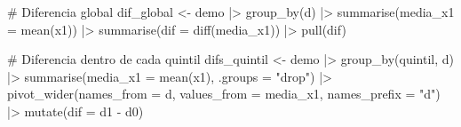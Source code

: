 \documentclass[
  letterpaper,
  DIV=11,
  numbers=noendperiod,
  oneside]{scrreprt}
\newenvironment{Shaded}{\begin{snugshade}}{\end{snugshade}}
\newcommand{\AttributeTok}[1]{\textcolor[rgb]{0.40,0.45,0.13}{#1}}
\newcommand{\CommentTok}[1]{\textcolor[rgb]{0.37,0.37,0.37}{#1}}
\newcommand{\FunctionTok}[1]{\textcolor[rgb]{0.28,0.35,0.67}{#1}}
\newcommand{\NormalTok}[1]{\textcolor[rgb]{0.00,0.23,0.31}{#1}}
\newcommand{\OtherTok}[1]{\textcolor[rgb]{0.00,0.23,0.31}{#1}}
\newcommand{\SpecialCharTok}[1]{\textcolor[rgb]{0.37,0.37,0.37}{#1}}
\newcommand{\StringTok}[1]{\textcolor[rgb]{0.13,0.47,0.30}{#1}}
\begin{document}
\begin{Shaded}
\begin{Highlighting}[]
\CommentTok{\# Diferencia global}
\NormalTok{dif\_global }\OtherTok{\textless{}{-}}\NormalTok{ demo }\SpecialCharTok{|\textgreater{}}
  \FunctionTok{group\_by}\NormalTok{(d) }\SpecialCharTok{|\textgreater{}}
  \FunctionTok{summarise}\NormalTok{(}\AttributeTok{media\_x1 =} \FunctionTok{mean}\NormalTok{(x1)) }\SpecialCharTok{|\textgreater{}}
  \FunctionTok{summarise}\NormalTok{(}\AttributeTok{dif =} \FunctionTok{diff}\NormalTok{(media\_x1)) }\SpecialCharTok{|\textgreater{}}
  \FunctionTok{pull}\NormalTok{(dif)}

\CommentTok{\# Diferencia dentro de cada quintil}
\NormalTok{difs\_quintil }\OtherTok{\textless{}{-}}\NormalTok{ demo }\SpecialCharTok{|\textgreater{}}
  \FunctionTok{group\_by}\NormalTok{(quintil, d) }\SpecialCharTok{|\textgreater{}}
  \FunctionTok{summarise}\NormalTok{(}\AttributeTok{media\_x1 =} \FunctionTok{mean}\NormalTok{(x1), }\AttributeTok{.groups =} \StringTok{"drop"}\NormalTok{) }\SpecialCharTok{|\textgreater{}}
  \FunctionTok{pivot\_wider}\NormalTok{(}\AttributeTok{names\_from =}\NormalTok{ d, }\AttributeTok{values\_from =}\NormalTok{ media\_x1,}
              \AttributeTok{names\_prefix =} \StringTok{"d"}\NormalTok{) }\SpecialCharTok{|\textgreater{}}
  \FunctionTok{mutate}\NormalTok{(}\AttributeTok{dif =}\NormalTok{ d1 }\SpecialCharTok{{-}}\NormalTok{ d0)}


\end{Highlighting}
\end{Shaded}
\end{document}
